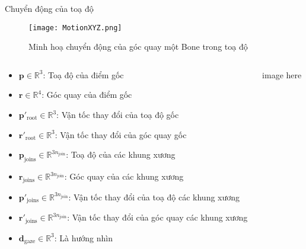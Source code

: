 \begin{frame}{Chuyển động của toạ độ}
		\begin{figure}
		\centering
		\texttt{[image: MotionXYZ.png]}
		\caption{Minh hoạ chuyển động của góc quay một Bone trong toạ độ}
	\end{figure}
	
	\begin{columns}
		\begin{column}{0.8\textwidth}
			\begin{itemize}
				\item $\mathbf{p} \in \mathbb{R}^3$: Toạ độ của điểm gốc
				\item $\mathbf{r} \in \mathbb{R}^4$: Góc quay của điểm gốc
				\item $\mathbf{p}'_{\text{root}} \in \mathbb{R}^3$: Vận tốc thay đổi của toạ độ gốc
				\item $\mathbf{r}'_{\text{root}} \in \mathbb{R}^3$: Vận tốc thay đổi của góc quay gốc
				
				\item $\mathbf{p}_{\text{joins}} \in \mathbb{R}^{3 n_{\text{join} }}$: Toạ độ của các khung xương
				\item $\mathbf{r}_{\text{joins}} \in \mathbb{R}^{3 n_{\text{join} }}$: Góc quay của các khung xương
				\item $\mathbf{p}'_{\text{joins}} \in \mathbb{R}^{3n_{\text{join} }}$: Vận tốc thay đổi của toạ độ các khung xương
				\item $\mathbf{r}'_{\text{joins}} \in \mathbb{R}^{3n_{\text{join} }}$: Vận tốc thay đổi của góc quay các khung xương
				
				\item $\mathbf{d}_{\text{gaze}} \in \mathbb{R}^3$: Là hướng nhìn
			\end{itemize}
		\end{column}
		
		\begin{column}{0.2\textwidth}
			image here
			
		\end{column}
	\end{columns}
	
\end{frame}


